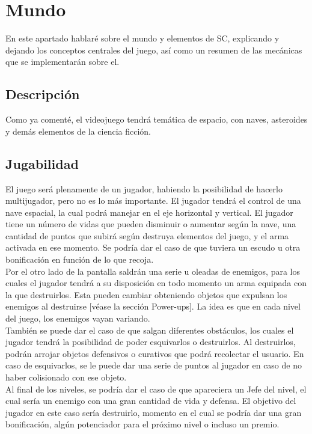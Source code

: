\documentclass[12pt, spanish, a4paper]{article}
\begin{document}
	\section{Mundo}
	
	En este apartado hablaré sobre el mundo y elementos de SC, explicando y dejando los conceptos centrales del juego, así como un resumen de las mecánicas que se implementarán sobre el.
	
	\subsection{Descripción}
	
	Como ya comenté, el videojuego tendrá temática de espacio, con naves, asteroides y demás elementos de la ciencia ficción.
	
	\subsection{Jugabilidad}

	El juego será plenamente de un jugador, habiendo la posibilidad de hacerlo multijugador, pero no es lo más importante. El jugador tendrá el control de una nave espacial, la cual podrá manejar en el eje horizontal y vertical. El jugador tiene un número de vidas que pueden disminuir o aumentar según la nave, una cantidad de puntos que subirá según destruya elementos del juego, y el arma activada en ese momento. Se podría dar el caso de que tuviera un escudo u otra bonificación en función de lo que recoja. \\
	
	Por el otro lado de la pantalla saldrán una serie u oleadas de enemigos, para los cuales el jugador tendrá a su disposición en todo momento un arma equipada con la que destruirlos. Esta pueden cambiar obteniendo objetos que expulsan los enemigos al destruirse [véase la sección Power-ups]. La idea es que en cada nivel del juego, los enemigos vayan variando. \\
	
	También se puede dar el caso de que salgan diferentes obstáculos, los cuales el jugador tendrá la posibilidad de poder esquivarlos o destruirlos. Al destruirlos, podrán arrojar objetos defensivos o curativos que podrá recolectar el usuario. En caso de esquivarlos, se le puede dar una serie de puntos al jugador en caso de no haber colisionado con ese objeto. \\
	
	Al final de los niveles, se podría dar el caso de que apareciera un Jefe del nivel, el cual sería un enemigo con una gran cantidad de vida y defensa. El objetivo del jugador en este caso sería destruirlo, momento en el cual se podría dar una gran bonificación, algún potenciador para el próximo nivel o incluso un premio.
	
\end{document}
